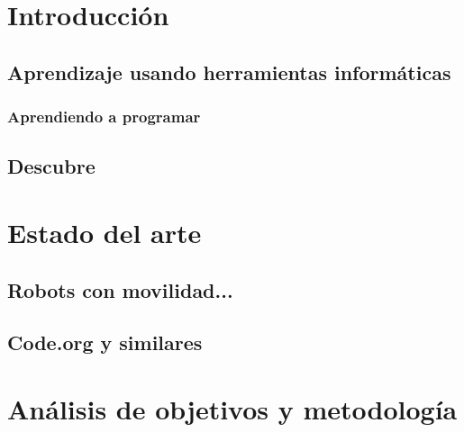 


\chapter{Introducción}

\section{Aprendizaje usando herramientas informáticas}
\label{sec:Aprendizaje usando herramientas informáticas}

\subsection{Aprendiendo a programar}
\label{sub:Aprendiendo a programar}

\section{Descubre}
\label{sec:Descubre}



\chapter{Estado del arte}


\section{Robots con movilidad...}
\label{sec:Robots con movilidad...}

\section{Code.org y similares}
\label{sec:Code.org y similares}



\chapter{Análisis de objetivos y metodología}



